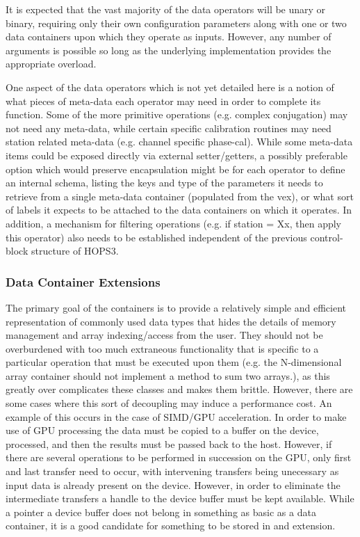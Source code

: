 It is expected that the vast majority of the data operators will be unary or binary, requiring only their own configuration parameters along with one or two data containers upon which they operate as inputs. However, any number of arguments is possible so long as the underlying implementation provides the appropriate overload.

One aspect of the data operators which is not yet detailed here is a notion of what pieces of meta-data each operator may need in order to complete its function. Some of the more primitive operations (e.g. complex conjugation) may not need any meta-data, while certain 
specific calibration routines may need station related meta-data (e.g. channel specific phase-cal).
While some meta-data items could be exposed directly via external setter/getters, a possibly preferable option which would preserve encapsulation might be for each operator to define an internal schema, 
listing the keys and type of the parameters it needs to retrieve from a single meta-data container (populated from the vex), or what sort of labels it expects to be attached to the data containers on which it operates.
In addition, a mechanism for filtering operations (e.g. if station = Xx, then apply this operator) also needs to be established independent of the previous control-block structure of HOPS3.







\subsubsection{Data Container Extensions}

The primary goal of the containers is to provide a relatively simple and efficient representation of commonly used data types that hides the details of
memory management and array indexing/access from the user. They should not be overburdened with too much extraneous functionality that is specific to a particular operation that must be executed upon them (e.g. the N-dimensional array container should not implement a method to sum two arrays.), as this greatly
over complicates these classes and makes them brittle. However, there are some cases where this sort of decoupling may induce a performance cost. An example of
this occurs in the case of SIMD/GPU acceleration. In order to make use of GPU processing the data must be copied to a buffer on the device, processed, and then the results must be passed back to the host. However, if there are several operations to be performed in succession on the GPU, only first and last transfer
need to occur, with intervening transfers being unecessary as input data is already present on the device. However, in order to eliminate the intermediate transfers a handle to the device buffer must be kept available. While a pointer a device buffer does not belong in something as basic as a data container, it
is a good candidate for something to be stored in and extension.


